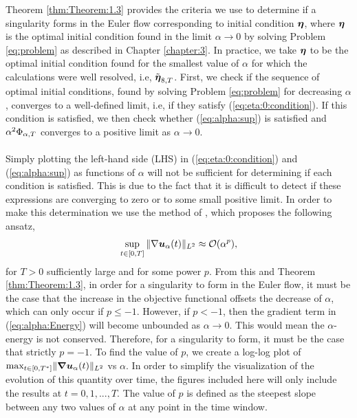 Theorem \ref{thm:Theorem:1.3} provides the criteria we use to determine if a singularity forms in the Euler flow corresponding to initial condition ${\boldsymbol \eta}$, where ${\boldsymbol \eta}$ is the optimal initial condition found in the limit $\alpha\rightarrow 0$ by solving Problem \ref{eq:problem} as described in Chapter \ref{chapter:3}. In practice, we take ${\boldsymbol \eta}$ to be the optimal initial condition found for the smallest value of $\alpha$ for which the calculations were well resolved, i.e, $\tilde{{\boldsymbol \eta}}_{8,T}$. First, we check if the sequence of optimal initial conditions, found by solving Problem \ref{eq:problem} for decreasing $\alpha$, converges to a well-defined limit, i.e, if they satisfy (\ref{eq:eta:0:condition}). If this condition is satisfied, we then check whether (\ref{eq:alpha:sup}) is satisfied and $\alpha^2\Phi_{\alpha,T}$ converges to a positive limit as $\alpha\rightarrow 0$. 
\\~\\
Simply plotting the left-hand side (LHS) in (\ref{eq:eta:0:condition}) and (\ref{eq:alpha:sup}) as functions of $\alpha$ will not be sufficient for determining if each condition is satisfied. This is due to the fact that it is difficult to detect if these expressions are converging to zero or to some small positive limit. In order to make this determination we use the method of \cite{larios_computational_2018}, which proposes the following ansatz,
\begin{equation}\label{eq:ansatz:1}
\sup_{t\in[0,T]}\|\nabla\boldsymbol u_\alpha(t)\|_{L^2} \approx \mathcal{O}(\alpha^p),
\end{equation}
for $T > 0$ sufficiently large and for some power $p$. From this and Theorem \ref{thm:Theorem:1.3}, in order for a singularity to form in the Euler flow, it must be the case that the increase in the objective functional offsets the decrease of $\alpha$, which can only occur if $p\leq -1$. However, if $p<-1$, then the gradient term in (\ref{eq:alpha:Energy}) will become unbounded as $\alpha\rightarrow 0$. This would mean the $\alpha$-energy is not conserved. Therefore, for a singularity to form, it must be the case that strictly $p = -1$. To find the value of $p$, we create a log-log plot of $\text{max}_{t\in[0,T^*]}\|{\boldsymbol \nabla} \boldsymbol u_\alpha(t)\|_{L^2}$ vs $\alpha$. In order to simplify the visualization of the evolution of this quantity over time, the figures included here will only include the results at $t=0,1,...,T$. The value of $p$ is defined as the steepest slope between any two values of $\alpha$ at any point in the time window.
\\~\\
